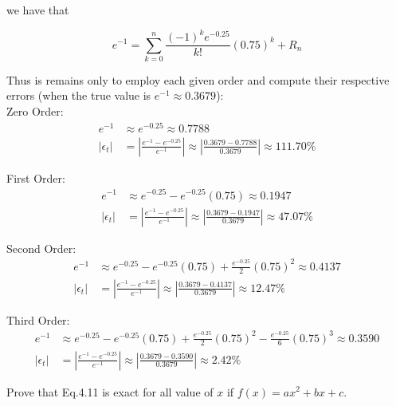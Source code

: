 \documentclass{article}
\begin{document}
\begin{itemize}
	we have that
	
	\[ e^{-1} = \sum_{k=0}^{n} \frac{(-1)^{k}e^{-0.25}}{k!} (0.75)^{k} + R_{n} \]
	
	Thus is remains only to employ each given order and compute their respective errors (when the true value is $e^{-1} \approx 0.3679$):\\
	
	Zero Order:
	\begin{align*}
	e^{-1} &\approx e^{-0.25} \approx \boxed{0.7788}\\	
	\left| \epsilon_{t} \right| &= \left| \frac{e^{-1}-e^{-0.25}}{e^{-1}} \right| \approx \left| \frac{0.3679-0.7788}{0.3679} \right| \approx 111.70\%
	\end{align*}
	
	First Order:
	\begin{align*}
	e^{-1} &\approx e^{-0.25} - e^{-0.25}(0.75) \approx \boxed{0.1947}\\	
	\left| \epsilon_{t} \right| &= \left| \frac{e^{-1}-e^{-0.25}}{e^{-1}} \right| \approx \left| \frac{0.3679-0.1947}{0.3679} \right| \approx 47.07\%
	\end{align*}
	
	Second Order:
	\begin{align*}
	e^{-1} &\approx e^{-0.25} - e^{-0.25}(0.75) + \frac{e^{-0.25}}{2} (0.75)^{2} \approx \boxed{0.4137}\\	
	\left| \epsilon_{t} \right| &= \left| \frac{e^{-1}-e^{-0.25}}{e^{-1}} \right| \approx \left| \frac{0.3679-0.4137}{0.3679} \right| \approx 12.47\%
	\end{align*}
	
	Third Order:
	\begin{align*}
	e^{-1} &\approx e^{-0.25} - e^{-0.25}(0.75) + \frac{e^{-0.25}}{2} (0.75)^{2} - \frac{e^{-0.25}}{6}(0.75)^{3} \approx \boxed{0.3590}\\
	\left| \epsilon_{t} \right| &= \left| \frac{e^{-1}-e^{-0.25}}{e^{-1}} \right| \approx \left| \frac{0.3679-0.3590}{0.3679} \right| \approx 2.42\%
	\end{align*}
		
\end{itemize}

\setcounter{problem}{13}
\begin{problem}

	Prove that Eq.4.11 is exact for all value of $x$ if $f(x)=ax^{2} + bx + c$.
	
\end{problem}
\end{document}
